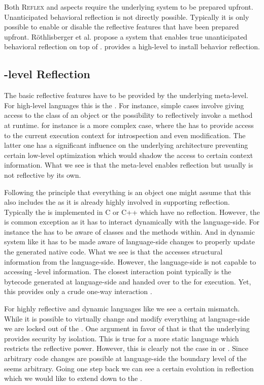 Both \textsc{Reflex} and aspects require the underlying system to be prepared upfront.
Unanticipated behavioral reflection is not directly possible.
Typically it is only possible to enable or disable the reflective features that have been prepared upfront.
Röthlisberger et al. propose \Gepetto a system \cite{Roet07b} that enables true unanticipated behavioral reflection on top of \ST.
\Gepetto provides a high-level \API to install behavior reflection.

\subsection{\VM-level Reflection}
The basic reflective features have to be provided by the underlying meta-level.
For high-level languages this is the \VM.
For instance, simple cases involve giving access to the class of an object or the possibility to reflectively invoke a method at runtime.
\PH for instance is a more complex case, where the \VM has to provide access to the current execution context for introspection and even modification.
The latter one has a significant influence on the underlying \VM architecture preventing certain low-level optimization which would shadow the access to certain context information.
What we see is that the meta-level enables reflection but usually is not reflective by its own.

Following the \ST principle that everything is an object one might assume that this also includes the \VM as it is already highly involved in supporting reflection.
Typically the \VM is implemented in C or C++ which have no reflection.
However, the \JIT is common exception as it has to interact dynamically with the language-side.
For instance the \JIT has to be aware of classes and the methods within.
And in dynamic system like \PH it has to be made aware of language-side changes to properly update the generated native code.
What we see is that the \JIT accesses structural information from the language-side.
However, the language-side is not capable to accessing \VM-level information.
The closest \VM interaction point typically is the bytecode generated at language-side and handed over to the \VM for execution.
Yet, this provides only a crude one-way interaction \cite{Kell12a}.

For highly reflective and dynamic languages like \PH we see a certain mismatch.
While it is possible to virtually change and modify everything at language-side we are locked out of the \VM.
One argument in favor of that is that the underlying \VM provides security by isolation.
This is true for a more static language which restricts the reflective power.
However, this is clearly not the case in \PH or \ST.
Since arbitrary code changes are possible at language-side the boundary level of the \VM seems arbitrary.
Going one step back we can see a certain evolution in reflection which we would like to extend down to the \VM.

